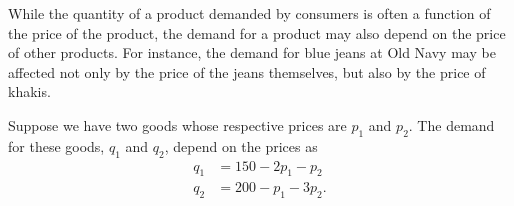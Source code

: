 \begin{activity} \label{A:10.7.10} While the quantity of a product
  demanded by consumers is often a function of the price of the
  product, the demand for a product may also depend on the price of
  other products.  For instance, the demand for blue jeans at Old Navy may be affected not only by the price of the jeans themselves, but also by the price of khakis.

  Suppose we have two goods whose respective prices are $p_1$ and
  $p_2$.  The demand for these goods, $q_1$ and $q_2$, depend on the
  prices as 
  \begin{align}
    q_1 &= 150 - 2p_1 - p_2 \label{eq:good1} \\
    q_2 &= 200 - p_1 - 3p_2. \label{eq:good2}
  \end{align}


\end{activity}
